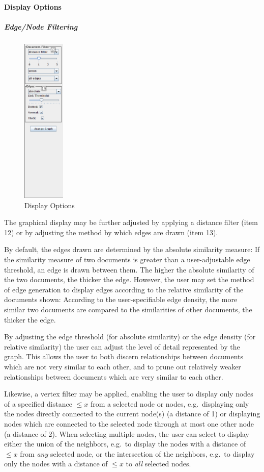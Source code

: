 \paragraph{Display Options}
\subparagraph{Edge/Node Filtering}

\begin{figure}[ht]
\centering
\caption{Display Options}
\includegraphics[height=80mm]{displayopts.png}
\end{figure}

The graphical display may be further adjusted by applying a distance filter (item 12) or by adjusting the method by which edges are drawn (item 13).

By default, the edges drawn are determined by the absolute similarity measure: If the similarity measure of two documents is greater than a user-adjustable edge threshold, an edge is drawn between them. The higher the absolute similarity of the two documents, the thicker the edge. However, the user may set the method of edge generation to display edges according to the relative similarity of the documents shown: According to the user-specifiable edge density, the more similar two documents are compared to the similarities of other documents, the thicker the edge.

By adjusting the edge threshold (for absolute similarity) or the edge density (for relative similarity) the user can adjust the level of detail represented by the graph. This allows the user to both discern relationships between documents which are not very similar to each other, and to prune out relatively weaker relationships between documents which are very similar to each other.

Likewise, a vertex filter may be applied, enabling the user to display only nodes of a specified distance $\leq x$ from a selected node or nodes, e.g.\ displaying only the nodes directly connected to the current node(s) (a distance of 1) or displaying nodes which are connected to the selected node through at most one other node (a distance of 2). When selecting multiple nodes, the user can select to display either the union of the neighbors, e.g.\ to display the nodes with a distance of $\leq x$ from \emph{any} selected node, or the intersection of the neighbors, e.g.\ to display only the nodes with a distance of $\leq x$ to \emph{all} selected nodes.

